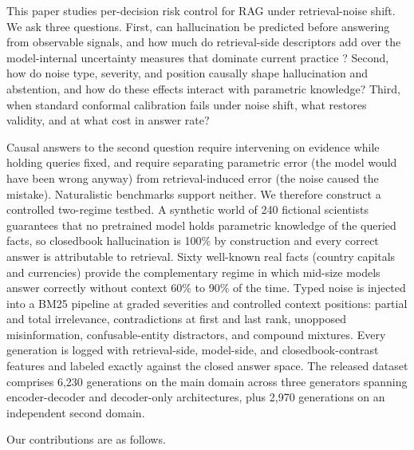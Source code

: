 \documentclass[sn-basic]{sn-jnl}
\theoremstyle{thmstyleone}
\theoremstyle{thmstyletwo}
\begin{document}
This paper studies per-decision risk control for RAG under
retrieval-noise shift. We ask three questions. First, can hallucination
be predicted before answering from observable signals, and how much do
retrieval-side descriptors add over the model-internal uncertainty
measures that dominate current practice
\citep{kuhn2023semantic,farquhar2024nature,kossen2024sep}? Second, how
do noise type, severity, and position causally shape hallucination and
abstention, and how do these effects interact with parametric
knowledge? Third, when standard conformal calibration fails under noise
shift, what restores validity, and at what cost in answer rate?

Causal answers to the second question require intervening on evidence
while holding queries fixed, and require separating parametric error
(the model would have been wrong anyway) from retrieval-induced error
(the noise caused the mistake). Naturalistic benchmarks support
neither. We therefore construct a controlled two-regime testbed. A
synthetic world of 240 fictional scientists guarantees that no
pretrained model holds parametric knowledge of the queried facts, so
closedbook hallucination is 100\% by construction and every correct
answer is attributable to retrieval. Sixty well-known real facts
(country capitals and currencies) provide the complementary regime in
which mid-size models answer correctly without context 60\% to 90\% of
the time. Typed noise is injected into a BM25 pipeline at graded
severities and controlled context positions: partial and total
irrelevance, contradictions at first and last rank, unopposed
misinformation, confusable-entity distractors, and compound mixtures.
Every generation is logged with retrieval-side, model-side, and
closedbook-contrast features and labeled exactly against the closed
answer space. The released dataset comprises 6{,}230 generations on the main
domain across three generators spanning encoder-decoder and
decoder-only architectures, plus 2{,}970 generations on an independent
second domain.

Our contributions are as follows.
\end{document}
